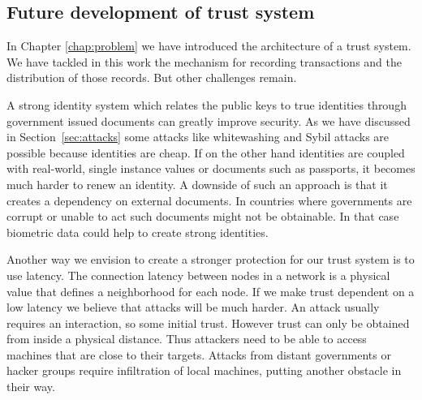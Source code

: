\subsection{Future development of trust system}
In Chapter \ref{chap:problem} we have introduced the architecture of a trust system. We have tackled
in this work the mechanism for recording transactions and the distribution of those records. But
other challenges remain. 

A strong identity system which relates the public keys to true identities through government issued
documents can greatly improve security. As we have discussed in Section~\ref{sec:attacks} some 
attacks like whitewashing and Sybil attacks are possible because identities are cheap. If on the 
other hand identities are coupled with real-world, single instance values or documents such as 
passports, it becomes much harder to renew an identity. A downside of such an approach is that 
it creates a dependency on external documents. In countries where governments are corrupt or 
unable to act such documents might not be obtainable. In that case biometric data could help to 
create strong identities. 

Another way we envision to create a stronger protection for our trust system is to use latency. The 
connection latency between nodes in a network is a physical value that defines a neighborhood for  
each node. If we make trust dependent on a low latency we believe that attacks will be much harder.
An attack usually requires an interaction, so some initial trust. However trust can only be obtained
from inside a physical distance. Thus attackers need to be able to access machines that are close
to their targets. Attacks from distant governments or hacker groups require infiltration of local
machines, putting another obstacle in their way.



